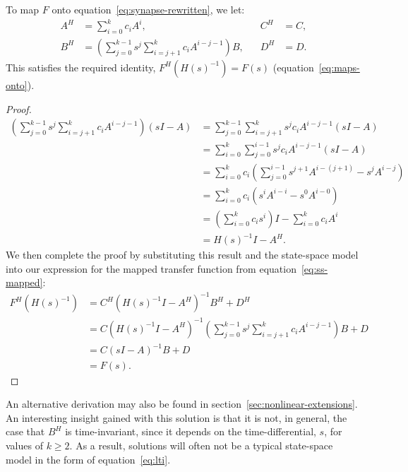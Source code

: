 \begin{theorem}
\label{thm:general-linear}
To map $F$ onto equation~\ref{eq:synapse-rewritten}, we let: %
\begin{equation} \label{eq:general-linear}
\begin{aligned}
A^H &= \sum_{i=0}^k c_i A^i \text{,} & \quad C^H &= C \text{,} \\
B^H &= \left( \sum_{j=0}^{k-1} s^j \sum_{i=j+1}^k c_i A^{i-j-1} \right) B \text{,} & \quad D^H &= D \text{.}
\end{aligned}
\end{equation}
This satisfies the required identity, $F^{H}(H(s)^{-1}) = F(s)$ (equation~\ref{eq:maps-onto}).
\end{theorem}

\begin{proof}
\begin{align*}
\left( \sum_{j=0}^{k-1} s^j \sum_{i=j+1}^k c_i A^{i-j-1} \right) (sI - A)  &= \sum_{j=0}^{k-1} \sum_{i=j+1}^k s^j c_i A^{i-j-1} (sI - A) \\
&= \sum_{i=0}^{k} \sum_{j=0}^{i-1} s^j c_i A^{i-j-1} (sI - A)  \\
&= \sum_{i=0}^k c_i \left( \sum_{j=0}^{i-1} s^{j+1} A^{i - (j + 1)} - s^j A^{i - j} \right) \\
&= \sum_{i=0}^k c_i \left( s^i A^{i - i} - s^0 A^{i-0} \right) \\
&= \left( \sum_{i=0}^k c_i s^i \right) I - \sum_{i=0}^k c_i A^i \\
&= H(s)^{-1}I - A^H \text{.}
\end{align*}
We then complete the proof by substituting this result and the state-space model into our expression for the mapped transfer function from equation~\ref{eq:ss-mapped}:
\begin{align*}
F^H(H(s)^{-1}) &= C^H(H(s)^{-1}I - A^H)^{-1} B^H + D^H \\
&= C(H(s)^{-1}I - A^H)^{-1} \left( \sum_{j=0}^{k-1} s^j \sum_{i=j+1}^k c_i A^{i-j-1} \right) B + D \\
&= C(sI - A)^{-1} B + D \\
&= F(s) \text{.}
\end{align*}
\end{proof}

An alternative derivation may also be found in section~\ref{sec:nonlinear-extensions}. %
An interesting insight gained with this solution is that it is not, in general, the case that $B^H$ is time-invariant, since it depends on the time-differential, $s$, for values of $k \ge 2$.
As a result, solutions will often not be a typical state-space model in the form of equation~\ref{eq:lti}.

